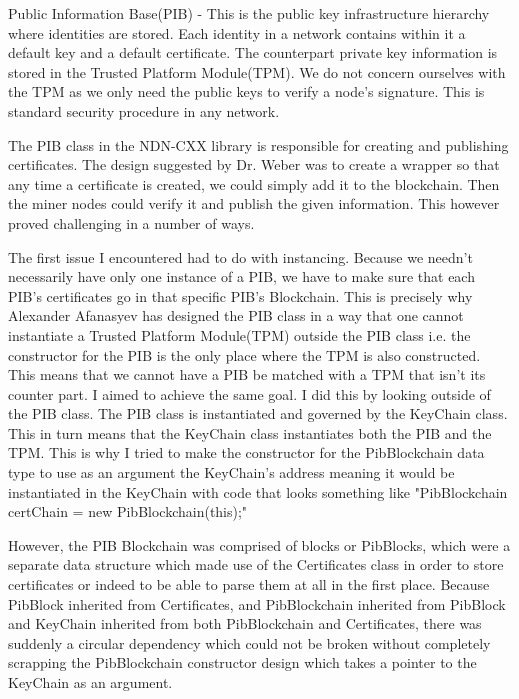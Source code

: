 Public Information Base(PIB) - This is the public key infrastructure hierarchy where identities are stored. Each identity in a network contains within it a default key and a default certificate. The counterpart private key information is stored in the Trusted Platform Module(TPM). We do not concern ourselves with the TPM as we only need the public keys to verify a node's signature. This is standard security procedure in any network. 

The PIB class in the NDN-CXX library is responsible for creating and publishing certificates. The design suggested by Dr. Weber was to create a wrapper so that any time a certificate is created, we could simply add it to the blockchain. Then the miner nodes could verify it and publish the given information. This however proved challenging in a number of ways. 

The first issue I encountered had to do with instancing. Because we needn't necessarily have only one instance of a PIB, we have to make sure that each PIB's certificates go in that specific PIB's Blockchain. This is precisely why Alexander Afanasyev has designed the PIB class in a way that one cannot instantiate a Trusted Platform Module(TPM) outside the PIB class i.e. the constructor for the PIB is the only place where the TPM is also constructed. This means that we cannot have a PIB be matched with a TPM that isn't its counter part. I aimed to achieve the same goal. I did this by looking outside of the PIB class. The PIB class is instantiated and governed by the KeyChain class. This in turn means that the KeyChain class instantiates both the PIB and the TPM. This is why I tried to make the constructor for the PibBlockchain data type to use as an argument the KeyChain's address meaning it would be instantiated in the KeyChain with code that looks something like "PibBlockchain certChain = new PibBlockchain(this);"

However, the PIB Blockchain was comprised of blocks or PibBlocks, which were a separate data structure which made use of the Certificates class in order to store certificates or indeed to be able to parse them at all in the first place. Because PibBlock inherited from Certificates, and PibBlockchain inherited from PibBlock and KeyChain inherited from both PibBlockchain and Certificates, there was suddenly a circular dependency which could not be broken without completely scrapping the PibBlockchain constructor design which takes a pointer to the KeyChain as an argument. 

